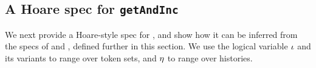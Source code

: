 \subsection{A Hoare spec for \texttt{getAndInc}}
\label{sec:spec-gaa}

We next provide a Hoare-style spec for , and show how
it can be inferred from the specs of  and
, defined further in this section.  We use the
logical variable $\iota$ and its variants to range over token sets, and
$\eta$ to range over histories.
%

%
%

